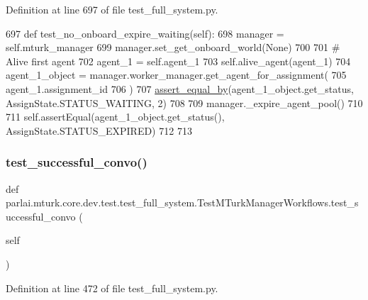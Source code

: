 Definition at line 697 of file test\+\_\+full\+\_\+system.\+py.


\begin{DoxyCode}
697     \textcolor{keyword}{def }test\_no\_onboard\_expire\_waiting(self):
698         manager = self.mturk\_manager
699         manager.set\_get\_onboard\_world(\textcolor{keywordtype}{None})
700 
701         \textcolor{comment}{# Alive first agent}
702         agent\_1 = self.agent\_1
703         self.alive\_agent(agent\_1)
704         agent\_1\_object = manager.worker\_manager.get\_agent\_for\_assignment(
705             agent\_1.assignment\_id
706         )
707         \hyperlink{namespaceparlai_1_1mturk_1_1core_1_1test_1_1test__full__system_a0b463246d35658a2e422010f13dcf819}{assert\_equal\_by}(agent\_1\_object.get\_status, AssignState.STATUS\_WAITING, 2)
708 
709         manager.\_expire\_agent\_pool()
710 
711         self.assertEqual(agent\_1\_object.get\_status(), AssignState.STATUS\_EXPIRED)
712 
713 
\end{DoxyCode}
\mbox{\label{classparlai_1_1mturk_1_1core_1_1dev_1_1test_1_1test__full__system_1_1TestMTurkManagerWorkflows_a584e2c301ed81a4cd3b68520ed6e0096}} 
\subsubsection{\texorpdfstring{test\+\_\+successful\+\_\+convo()}{test\_successful\_convo()}}
{\footnotesize\ttfamily def parlai.\+mturk.\+core.\+dev.\+test.\+test\+\_\+full\+\_\+system.\+Test\+M\+Turk\+Manager\+Workflows.\+test\+\_\+successful\+\_\+convo (\begin{DoxyParamCaption}\item[{}]{self }\end{DoxyParamCaption})}



Definition at line 472 of file test\+\_\+full\+\_\+system.\+py.



